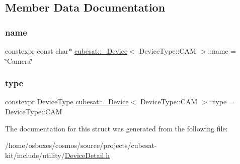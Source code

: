\subsection{Member Data Documentation}
\mbox{\label{structcubesat_1_1__Device_3_01DeviceType_1_1CAM_01_4_a3e38ddec6f8edd02aa2ff5953134a692}} 
\subsubsection{\texorpdfstring{name}{name}}
{\footnotesize\ttfamily constexpr const char$\ast$ \hyperlink{structcubesat_1_1__Device}{cubesat\+::\+\_\+\+Device}$<$ Device\+Type\+::\+C\+AM $>$\+::name = \char`\"{}Camera\char`\"{}\hspace{0.3cm}{\ttfamily [static]}}

\mbox{\label{structcubesat_1_1__Device_3_01DeviceType_1_1CAM_01_4_a7b5fe0fa68ade4878d463f882d69c1ac}} 
\subsubsection{\texorpdfstring{type}{type}}
{\footnotesize\ttfamily constexpr Device\+Type \hyperlink{structcubesat_1_1__Device}{cubesat\+::\+\_\+\+Device}$<$ Device\+Type\+::\+C\+AM $>$\+::type = Device\+Type\+::\+C\+AM\hspace{0.3cm}{\ttfamily [static]}}



The documentation for this struct was generated from the following file\+:\begin{DoxyCompactItemize}
\item 
/home/osboxes/cosmos/source/projects/cubesat-\/kit/include/utility/\hyperlink{DeviceDetail_8h}{Device\+Detail.\+h}\end{DoxyCompactItemize}
